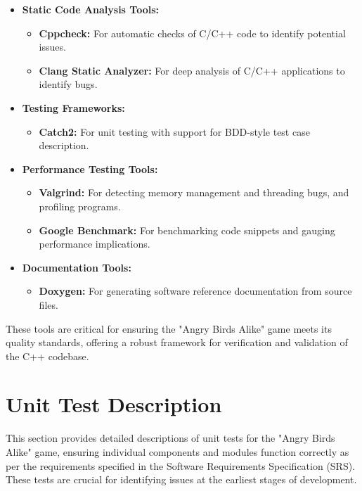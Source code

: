 \documentclass[12pt]{article}
\begin{document}
\begin{itemize}
    \item \textbf{Static Code Analysis Tools:}
        \begin{itemize}
            \item \textbf{Cppcheck:} For automatic checks of C/C++ code to identify potential issues.
            \item \textbf{Clang Static Analyzer:} For deep analysis of C/C++ applications to identify bugs.
        \end{itemize}
    \item \textbf{Testing Frameworks:}
        \begin{itemize}
            \item \textbf{Catch2:} For unit testing with support for BDD-style test case description.
        \end{itemize}
    \item \textbf{Performance Testing Tools:}
        \begin{itemize}
            \item \textbf{Valgrind:} For detecting memory management and threading bugs, and profiling programs.
            \item \textbf{Google Benchmark:} For benchmarking code snippets and gauging performance implications.
        \end{itemize}
    \item \textbf{Documentation Tools:}
        \begin{itemize}
            \item \textbf{Doxygen:} For generating software reference documentation from source files.
        \end{itemize}
\end{itemize}

These tools are critical for ensuring the "Angry Birds Alike" game meets its quality standards, offering a robust framework for verification and validation of the C++ codebase.


\section{Unit Test Description}

This section provides detailed descriptions of unit tests for the "Angry Birds Alike" game, ensuring individual components and modules function correctly as per the requirements specified in the Software Requirements Specification (SRS). These tests are crucial for identifying issues at the earliest stages of development.
\end{document}
